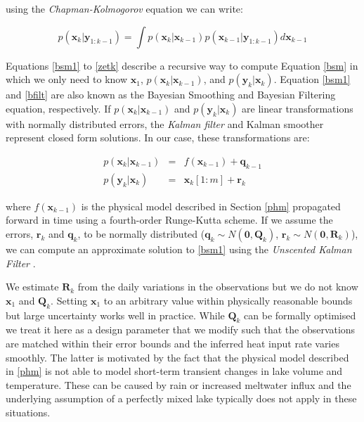 \documentclass{bmcart}
\newcommand{\bm}[1]{{\textbf{#1}}}
\begin{document}
using the \textit{Chapman-Kolmogorov} equation
\cite{sarkkaBayesianFilteringSmoothing2013} we can write:

\begin{equation}
p(\bm{x}_k|\bm{y}_{1:k-1}) = \int p(\bm{x}_k|\bm{x}_{k-1})p(\bm{x}_{k-1}|\bm{y}_{1:k-1})d\bm{x}_{k-1} 
\end{equation}

Equations \ref{bsm1} to \ref{zetk} describe a recursive way to compute Equation
\ref{bsm} in which we only need to know $\bm{x}_1$,
$p(\bm{x}_k|\bm{x}_{k-1})$, and $p(\bm{y}_k|\bm{x}_k)$. Equation \ref{bsm1} and
\ref{bfilt} are also known as the Bayesian Smoothing and Bayesian Filtering
equation, respectively. If $p(\bm{x}_k|\bm{x}_{k-1})$ and
$p(\bm{y}_k|\bm{x}_k)$ are linear transformations with normally distributed
errors, the \textit{Kalman filter} \cite{Kalman1960} and Kalman smoother
\cite{Rauch1965} represent closed form solutions. In our case, these
transformations are:

\begin{eqnarray}
p(\bm{x}_k|\bm{x}_{k-1}) & = & f(\bm{x}_{k-1}) + \bm{q}_{k-1} \\
    p(\bm{y}_k|\bm{x}_k) & = & \bm{x}_k[1:m] + \bm{r}_k   
\end{eqnarray}

where $f(\bm{x}_{k-1})$ is the physical model described in Section \ref{phm}
propagated forward in time using a fourth-order Runge-Kutta scheme. If we 
assume the errors, $\bm{r}_k$ and $\bm{q}_{k}$, to be normally distributed
($\bm{q}_{k} \sim N(\bm{0},
\bm{Q}_{k})$, $\bm{r}_k \sim N(\bm{0}, \bm{R}_k)$), we can compute an
approximate solution to \ref{bsm1} using the \textit{Unscented Kalman Filter}
\citep{Merwe2004, sarkkaBayesianFilteringSmoothing2013}.

We estimate $\bm{R}_k$ from the daily variations in the observations but we do
not know $\bm{x}_1$ and $\bm{Q}_{k}$. Setting $\bm{x}_1$ to an arbitrary value
within physically reasonable bounds but large uncertainty works well in
practice. While $\bm{Q}_{k}$ can be formally optimised we treat it here as a
design parameter that we modify such that the observations are matched within
their error bounds and the inferred heat input rate varies smoothly. The latter
is motivated by the fact that the physical model described in \ref{phm} is not
able to model short-term transient changes in lake volume and temperature. These
can be caused by rain or increased meltwater influx and the underlying
assumption of a perfectly mixed lake typically does not apply in these
situations.
\end{document}
